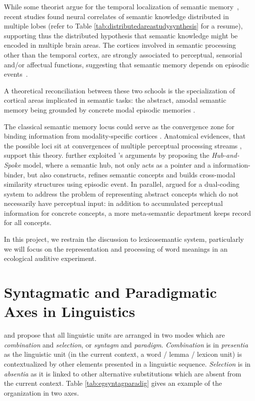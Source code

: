 While some theorist argue for the temporal localization of semantic memory~\parencite{saumierSemanticMemory2002, martinSemanticMemoryBrain2001}, recent studies found neural correlates of semantic knowledge distributed in multiple lobes (refer to Table \ref{tab:distributedareastudysynthesis} for a resume), supporting thus the distributed hypothesis that semantic knowledge might be encoded in multiple brain areas. The cortices involved in semantic processing other than the temporal cortex, are strongly associated to perceptual, sensorial and/or affectual functions, suggesting that semantic memory depends on episodic events~\parencite{moseleyNounsVerbsObjects2014}. 

A theoretical reconciliation between these two schools is the specialization of cortical areas implicated in semantic tasks: the abstract, amodal semantic memory being grounded by concrete modal episodic memories \parencite{pecherGroundingCognitionRole2005}. 

The classical semantic memory locus could serve as the convergence zone for binding information from modality-specific cortices \parencite{damasioNeuralBasisLexical1996, damasioNeuralSystemsWord2004, simmonsSimilarityintopographyPrincipleReconciling2003}. Anatomical evidences, that the possible loci sit at convergences of multiple perceptual processing streams \parencite{binderNeurobiologySemanticMemory2011}, support this theory. \textcite{pattersonWhereYouKnow2007} further exploited \citeauthor{damasioNeuralSystemsWord2004}'s arguments by proposing the \emph{Hub-and-Spoke} model, where a semantic hub, not only acts as a pointer and a information-binder, but also constructs, refines semantic concepts and builds cross-modal similarity structures using episodic event. In parallel, \textcite{paivioMindItsEvolution2008} argued for a dual-coding system to address the problem of representing abstract concepts which do not necessarily have perceptual input: in addition to accumulated perceptual information for concrete concepts, a more meta-semantic department keeps record for all concepts. 



In this project, we restrain the discussion to lexicosemantic system, particularly we will focus on the representation and processing of word meanings in an ecological auditive experiment. 

\section{Syntagmatic and Paradigmatic Axes in Linguistics}
\label{sec:IntroSyntagandParaAxies}
\textcite{jakobsonFundamentalsLanguage1963} and \textcite{desaussureCoursLinguistiqueGenerale1969} propose that all linguistic units are arranged in two modes which are \emph{combination} and \emph{selection}, or \emph{syntagm} and \emph{paradigm}. \emph{Combination} is in \emph{presentia} as the linguistic unit (in the current context, a word / lemma / lexicon unit) is contextualized by other elements presented in a linguistic sequence. \emph{Selection} is in \emph{absentia} as it is linked to other alternative substitutions which are absent from the current context. Table \ref{tab:egsyntagparadig} gives an example of the organization in two axes.

